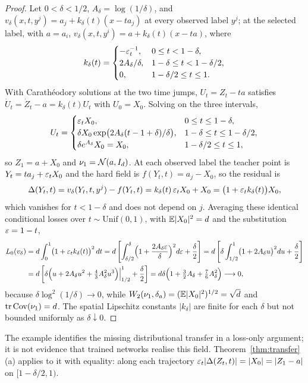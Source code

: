 \documentclass{article} %
\theoremstyle{plain}
\theoremstyle{definition}
\theoremstyle{remark}
\begin{document}
\begin{proof}
Let $0<\delta<1/2$, $A_\delta=\log(1/\delta)$, and $v_\delta(x,t,y^j)=a_j+k_\delta(t)(x-ta_j)$ at
every observed label $y^j$; at the selected label, with $a=a_i$,
$v_\delta(x,t,y^i)=a+k_\delta(t)(x-ta)$, where
\[
k_\delta(t)=
\begin{cases}
-\varepsilon_t^{-1},&0\le t<1-\delta,\\
2A_\delta/\delta,&1-\delta\le t<1-\delta/2,\\
0,&1-\delta/2\le t\le1.
\end{cases}
\]
With Carath\'eodory solutions at the two time jumps, $U_t=Z_t-ta$ satisfies
$\dot U_t=\dot Z_t-a=k_\delta(t)U_t$ with $U_0=X_0$. Solving on the three intervals,
\[
U_t=
\begin{cases}
\varepsilon_tX_0,&0\le t\le1-\delta,\\
\delta X_0\exp\bigl(2A_\delta(t-1+\delta)/\delta\bigr),&1-\delta\le t\le1-\delta/2,\\
\delta e^{A_\delta}X_0=X_0,&1-\delta/2\le t\le1,
\end{cases}
\]
so $Z_1=a+X_0$ and $\nu_1=\mathcal{N}(a,I_d)$. At each observed label the teacher point is
$Y_t=ta_j+\varepsilon_tX_0$ and the hard field is $f(Y_t,t)=a_j-X_0$, so the residual is
\[
\Delta(Y_t,t)=v_\delta(Y_t,t,y^j)-f(Y_t,t)=k_\delta(t)\,\varepsilon_tX_0+X_0=\bigl(1+\varepsilon_tk_\delta(t)\bigr)X_0,
\]
which vanishes for $t<1-\delta$ and does not depend on $j$. Averaging these identical conditional
losses over $t\sim\mathrm{Unif}(0,1)$, with $\mathbb{E}|X_0|^2=d$ and the substitution $\varepsilon=1-t$,
\begin{align*}
L_0(v_\delta)
&=d\int_0^1\bigl(1+\varepsilon_tk_\delta(t)\bigr)^2\,dt
=d\left[\int_{\delta/2}^{\delta}\Bigl(1+\frac{2A_\delta\varepsilon}{\delta}\Bigr)^2d\varepsilon+\frac\delta2\right]
=d\left[\delta\int_{1/2}^{1}\bigl(1+2A_\delta u\bigr)^2du+\frac\delta2\right]\\
&=d\left[\delta\Bigl(u+2A_\delta u^2+\tfrac43A_\delta^2u^3\Bigr)\Big|_{1/2}^{1}+\frac\delta2\right]
=d\delta\Bigl(1+\tfrac32A_\delta+\tfrac76A_\delta^2\Bigr)\longrightarrow0,
\end{align*}
because $\delta\log^2(1/\delta)\to0$, while $W_2(\nu_1,\delta_a)=(\mathbb{E}|X_0|^2)^{1/2}=\sqrt d$ and
$\operatorname{tr}\operatorname{Cov}(\nu_1)=d$. The spatial Lipschitz constants $|k_\delta|$ are finite for each $\delta$ but
not bounded uniformly as $\delta\downarrow0$.
\end{proof}

The example identifies the missing distributional transfer in a loss-only argument; it is not
evidence that trained networks realise this field. Theorem~\ref{thm:transfer}(a) applies to it with
equality: along each trajectory $\varepsilon_t|\Delta(Z_t,t)|=|X_0|=|Z_1-a|$ on $[1-\delta/2,1)$.
\end{document}
